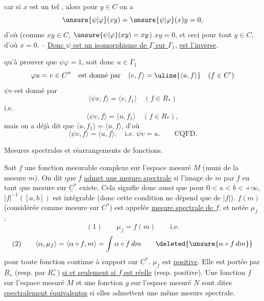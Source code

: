 
car si \(x\) est un tel , alors pour \(y\in C\) on a
\[
\unsure{\psi|\varphi}(xy)=\unsure{\psi|\varphi}(x)y=0,
\]
d'où (comme \(xy\in C\),  \(\unsure{\psi|\varphi}(xy)=xy\)) \(xy=0\), et ceci pour tout \(y\in C\), d'où \(x=0\). -- \uline{Donc \(\psi\) est un isomorphisme de \(\Gamma\) sur \(\Gamma_1\)},  \uline{est l'inverse}.

 qu'à prouver que \(\psi\varphi=1\), soit donc \(u\in\Gamma_1\)
\[
\varphi u=v\in C''\quad\text{est donné par}\quad\langle v,f\rangle=\uline{\langle u,f\rangle}\quad(f\in C')
\]
 \(\psi v\) est donné par
\[
\langle\psi v,f\rangle=\langle v,f_1\rangle\quad(f\in R_*)
\]
i.e.
\[
\langle\psi v,f\rangle=\langle u,f_1\rangle\quad(f\in R_*),
\]
mais on a déjà dit que \(\langle u,f_1\rangle=\langle u,f\rangle\), d'où
\[
\langle\psi v,f\rangle=\langle u,f\rangle,\quad\text{i.e. }\psi v=u.\qquad\text{CQFD.}
\]


Mesures spectrales et réarrangements de fonctions.


Soit \(f\) une fonction mesurable complexe sur l'espace mesuré \(M\) (muni de la mesure \(m\)). On dit que \(f\) \uline{admet une mesure spectrale} si l'image de \(m\) par \(f\) en tant que mesure sur \(\underline C^*\) existe. Cela signifie donc aussi que pour \(0<a<b<+\infty\), \(|f|^{-1}([a,b])\) est intégrable (donc cette condition ne dépend que de \(|f|\)). \(f(m)\) (considérée comme mesure sur \(C^*\)) est appelée \uline{mesure spectrale de \(f\)}, et notée \(\mu_f\) :
\[
(1)\qquad \mu_f=f(m)\qquad\text{i.e.}
\]
\[
(2)\qquad\langle\alpha,\mu_f\rangle=\langle\alpha\circ f,m\rangle=\int\alpha\circ f\,dm
\qquad\deleted{\unsure{\alpha\circ f\,dm}}
\]
pour toute fonction continue à support  sur \(\underline C^*\). \(\mu_f\) est \uline{positive}. Elle est portée par \(\underline R_*\) (resp. par \(R_*^+\)) \uline{si et seulement si \(f\) est réelle} (resp. positive).  Une fonction \(f\) sur l'espace mesuré \(M\) et une fonction \(g\) sur l'espace mesuré \(N\) sont dites \uline{spectralement équivalentes} si elles admettent une même mesure spectrale.

